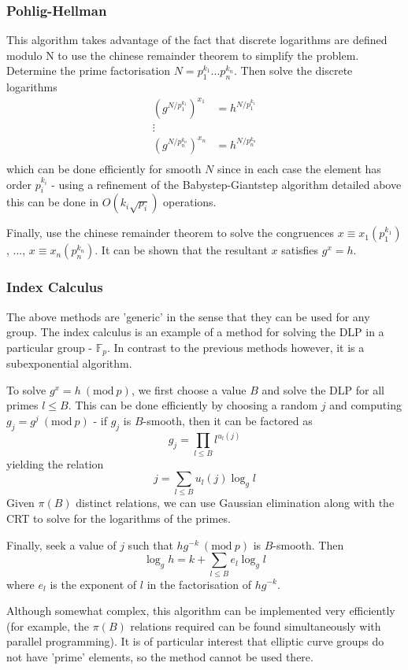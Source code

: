 \documentclass[a4paper]{article}
\newcommand{\Mod}[1]{\ (\text{mod}\ #1)}
\begin{document}
\subsubsection{Pohlig-Hellman}
This algorithm takes advantage of the fact that discrete logarithms are defined modulo N to use the chinese remainder theorem to simplify the problem. Determine the prime factorisation $N=p_1^{k_1}...p_n^{k_n}$. Then solve the discrete logarithms
\begin{align*}
	\left(g^{N/p_1^{k_1}}\right)^{x_1} &= h^{N/p_1^{k_1}} \\
	\vdots \\
	\left(g^{N/p_n^{k_n}}\right)^{x_n} &= h^{N/p_n^{k_n}} \\
\end{align*}
which can be done efficiently for smooth $N$ since in each case the element has order $p_i^{k_i}$ - using a refinement of the Babystep-Giantstep algorithm detailed above this can be done in $O(k_i \sqrt{p_i})$ operations.

Finally, use the chinese remainder theorem to solve the congruences $x \equiv x_1 (p_1^{k_1})$, ..., $x \equiv x_n (p_n^{k_n})$. It can be shown that the resultant $x$ satisfies $g^x=h$.

\subsubsection{Index Calculus}
The above methods are 'generic' in the sense that they can be used for any group. The index calculus is an example of a method for solving the DLP in a particular group - $\mathbb{F}_p$. In contrast to the previous methods however, it is a subexponential algorithm.

To solve $g^x = h \Mod{p}$, we first choose a value $B$ and solve the DLP for all primes $l\leq B$. This can be done efficiently by choosing a random $j$ and computing $g_j = g^j \Mod{p}$ - if $g_j$ is $B$-smooth, then it can be factored as $$g_j = \prod_{l\leq B}l^{u_l(j)}$$ yielding the relation $$j = \sum_{l\leq B}u_l(j)\log_g{l}$$
Given $\pi(B)$ distinct relations, we can use Gaussian elimination along with the CRT to solve for the logarithms of the primes.

Finally, seek a value of $j$ such that $hg^{-k} \Mod{p}$ is $B$-smooth. Then $$\log_g{h} = k + \sum_{l \leq B}e_l\log_g{l}$$
where $e_l$ is the exponent of $l$ in the factorisation of $hg^{-k}$.

Although somewhat complex, this algorithm can be implemented very efficiently (for example, the $\pi(B)$ relations required can be found simultaneously with parallel programming). It is of particular interest that elliptic curve groups do not have 'prime' elements, so the method cannot be used there.
\end{document}
